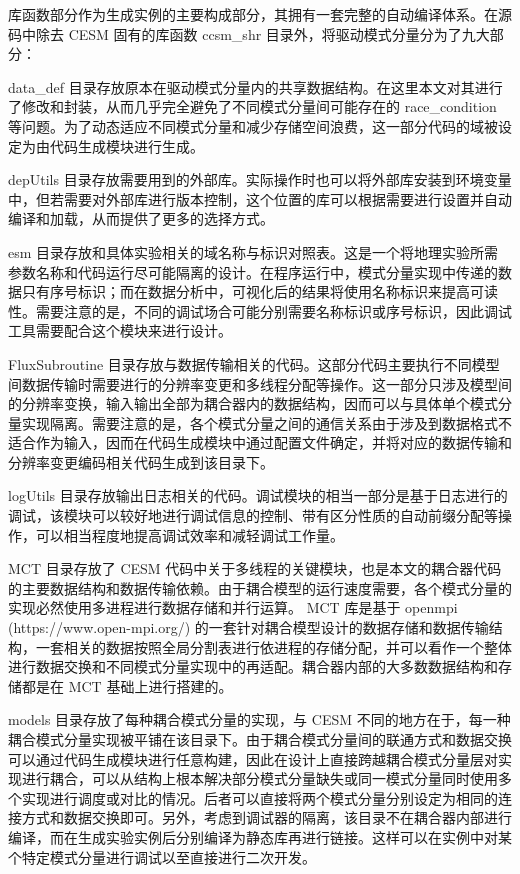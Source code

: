 库函数部分作为生成实例的主要构成部分，其拥有一套完整的自动编译体系。在源码中除去 CESM 固有的库函数 ccsm\_shr 目录外，将驱动模式分量分为了九大部分：

data\_def 目录存放原本在驱动模式分量内的共享数据结构。在这里本文对其进行了修改和封装，从而几乎完全避免了不同模式分量间可能存在的 race\_condition 等问题。为了动态适应不同模式分量和减少存储空间浪费，这一部分代码的域被设定为由代码生成模块进行生成。

depUtils 目录存放需要用到的外部库。实际操作时也可以将外部库安装到环境变量中，但若需要对外部库进行版本控制，这个位置的库可以根据需要进行设置并自动编译和加载，从而提供了更多的选择方式。

esm 目录存放和具体实验相关的域名称与标识对照表。这是一个将地理实验所需参数名称和代码运行尽可能隔离的设计。在程序运行中，模式分量实现中传递的数据只有序号标识；而在数据分析中，可视化后的结果将使用名称标识来提高可读性。需要注意的是，不同的调试场合可能分别需要名称标识或序号标识，因此调试工具需要配合这个模块来进行设计。

FluxSubroutine 目录存放与数据传输相关的代码。这部分代码主要执行不同模型间数据传输时需要进行的分辨率变更和多线程分配等操作。这一部分只涉及模型间的分辨率变换，输入输出全部为耦合器内的数据结构，因而可以与具体单个模式分量实现隔离。需要注意的是，各个模式分量之间的通信关系由于涉及到数据格式不适合作为输入，因而在代码生成模块中通过配置文件确定，并将对应的数据传输和分辨率变更编码相关代码生成到该目录下。

logUtils 目录存放输出日志相关的代码。调试模块的相当一部分是基于日志进行的调试，该模块可以较好地进行调试信息的控制、带有区分性质的自动前缀分配等操作，可以相当程度地提高调试效率和减轻调试工作量。

MCT 目录存放了 CESM 代码中关于多线程的关键模块，也是本文的耦合器代码的主要数据结构和数据传输依赖。由于耦合模型的运行速度需要，各个模式分量的实现必然使用多进程进行数据存储和并行运算。 MCT 库是基于 openmpi (https://www.open-mpi.org/) 的一套针对耦合模型设计的数据存储和数据传输结构，一套相关的数据按照全局分割表进行依进程的存储分配，并可以看作一个整体进行数据交换和不同模式分量实现中的再适配。耦合器内部的大多数数据结构和存储都是在 MCT 基础上进行搭建的。

models 目录存放了每种耦合模式分量的实现，与 CESM 不同的地方在于，每一种耦合模式分量实现被平铺在该目录下。由于耦合模式分量间的联通方式和数据交换可以通过代码生成模块进行任意构建，因此在设计上直接跨越耦合模式分量层对实现进行耦合，可以从结构上根本解决部分模式分量缺失或同一模式分量同时使用多个实现进行调度或对比的情况。后者可以直接将两个模式分量分别设定为相同的连接方式和数据交换即可。另外，考虑到调试器的隔离，该目录不在耦合器内部进行编译，而在生成实验实例后分别编译为静态库再进行链接。这样可以在实例中对某个特定模式分量进行调试以至直接进行二次开发。

